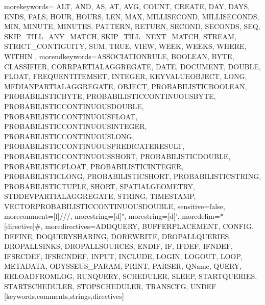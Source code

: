    {morekeywords={%
ALT, AND, AS, AT, AVG, COUNT, CREATE, DAY, DAYS, ENDS, FALS, HOUR, HOURS, LEN, MAX, MILLISECOND, MILLISECONDS, MIN, MINUTE, MINUTES, PATTERN, RETURN, SECOND, SECONDS, SEQ, SKIP_TILL_ANY_MATCH, SKIP_TILL_NEXT_MATCH, STREAM, STRICT_CONTIGUITY, SUM, TRUE, VIEW, WEEK, WEEKS, WHERE, WITHIN%
      },%
   morendkeywords={ASSOCIATIONRULE, BOOLEAN, BYTE, CLASSIFIER, CORRPARTIALAGGREGATE, DATE, DOCUMENT, DOUBLE, FLOAT, FREQUENTITEMSET, INTEGER, KEYVALUEOBJECT, LONG, MEDIANPARTIALAGGREGATE, OBJECT, PROBABILISTICBOOLEAN, PROBABILISTICBYTE, PROBABILISTICCONTINUOUSBYTE, PROBABILISTICCONTINUOUSDOUBLE, PROBABILISTICCONTINUOUSFLOAT, PROBABILISTICCONTINUOUSINTEGER, PROBABILISTICCONTINUOUSLONG, PROBABILISTICCONTINUOUSPREDICATERESULT, PROBABILISTICCONTINUOUSSHORT, PROBABILISTICDOUBLE, PROBABILISTICFLOAT, PROBABILISTICINTEGER, PROBABILISTICLONG, PROBABILISTICSHORT, PROBABILISTICSTRING, PROBABILISTICTUPLE, SHORT, SPATIALGEOMETRY, STDDEVPARTIALAGGREGATE, STRING, TIMESTAMP, VECTORPROBABILISTICCONTINUOUSDOUBLE},%
   sensitive=false,
   morecomment=[l]///,%
   morestring=[d]",%
   morestring=[d]',%
   moredelim=*[directive]\#,%
   moredirectives={ADDQUERY, BUFFERPLACEMENT, CONFIG, DEFINE, DOQUERYSHARING, DOREWRITE, DROPALLQUERIES, DROPALLSINKS, DROPALLSOURCES, ENDIF, IF, IFDEF, IFNDEF, IFSRCDEF, IFSRCNDEF, INPUT, INCLUDE, LOGIN, LOGOUT, LOOP, METADATA, ODYSSEUS_PARAM, PRINT, PARSER, QName, QUERY, RELOADFROMLOG, RUNQUERY, SCHEDULER, SLEEP, STARTQUERIES, STARTSCHEDULER, STOPSCHEDULER, TRANSCFG, UNDEF}%
}[keywords,comments,strings,directives]

